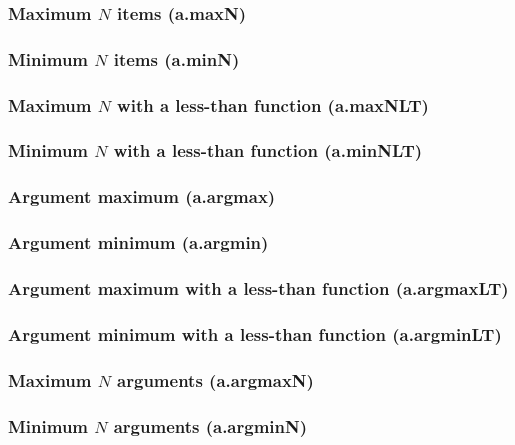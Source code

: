 \documentclass{article}
\theoremstyle{definition}
\begin{document}
\subsubsection{Maximum $N$ items (a.maxN)}

\subsubsection{Minimum $N$ items (a.minN)}

\subsubsection{Maximum $N$ with a less-than function (a.maxNLT)}

\subsubsection{Minimum $N$ with a less-than function (a.minNLT)}

\subsubsection{Argument maximum (a.argmax)}

\subsubsection{Argument minimum (a.argmin)}

\subsubsection{Argument maximum with a less-than function (a.argmaxLT)}

\subsubsection{Argument minimum with a less-than function (a.argminLT)}

\subsubsection{Maximum $N$ arguments (a.argmaxN)}

\subsubsection{Minimum $N$ arguments (a.argminN)}
\end{document}
